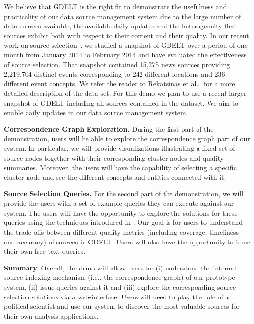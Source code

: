 \documentclass{sig-alternate}
\begin{document}
We believe that GDELT is the right fit to demonstrate the usefulness and practicality of our data source management system due to the large number of data sources available, the available daily updates and the heterogeneity that sources exhibit both with respect to their content and their quality. In our recent work on source selection~\cite{rekatsinas_ap:2014}, we studied a snapshot of GDELT over a period of one month from January 2014 to February 2014 and have evaluated the effectiveness of source selection. That snapshot contained 15,275 news sources providing 2,219,704 distinct events corresponding to 242 different locations and 236 different event concepts. We refer the reader to Rekatsinas et al.~\cite{rekatsinas_ap:2014} for a more detailed description of the data set. For this demo we plan to use a recent larger snapshot of GDELT including all sources contained in the dataset. We aim to enable daily updates in our data source management system.

\vspace{3pt}\noindent\textbf{Correspondence Graph Exploration.} During the first part of the demonstration, users will be able to explore the correspondence graph part of our system. In particular, we will provide visualizations illustrating a fixed set of source nodes together with their corresponding cluster nodes and quality summaries. Moreover, the users will have the capability of selecting a specific cluster node and see the different concepts and entities connected with it.

\vspace{3pt}\noindent\textbf{Source Selection Queries.} For the second part of the demonstration, we will provide the users with a set of example queries they can execute against our system. The users will have the opportunity to explore the solutions for these queries using the techniques introduced in . Our goal is for users to understand the trade-offs between different quality metrics (including coverage, timeliness and accuracy) of sources in GDELT. Users will also have the opportunity to issue their own free-text queries.

\vspace{3pt}\noindent\textbf{Summary.} Overall, the demo will allow users to: (i) understand the internal source indexing mechanism (i.e., the correspondence graph) of our prototype system, (ii) issue queries against it and (iii) explore the corresponding source selection solutions via a web-interface. Users will need to play the role of a political scientist and use our system to discover the most valuable sources for their own analysis applications.
 \balance
\end{document}
